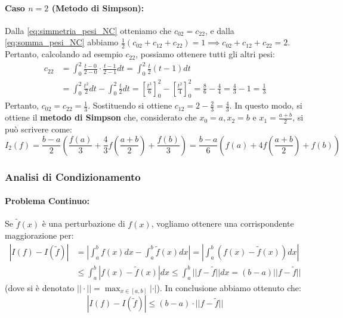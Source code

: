 \paragraph{Caso $n=2$ (Metodo di Simpson):}
Dalla \eqref{eq:simmetria_pesi_NC} otteniamo che $c_{02} = c_{22}$, e dalla \eqref{eq:somma_pesi_NC} abbiamo $\frac{1}{2}(c_{02} + c_{12} + c_{22}) = 1 \implies c_{02} + c_{12} + c_{22} = 2$.
Pertanto, calcolando ad esempio $c_{22}$, possiamo ottenere tutti gli altri pesi:
\begin{align*}
c_{22} &= \int_{0}^{2} \frac{t-0}{2-0} \cdot \frac{t-1}{2-1} dt = \int_{0}^{2} \frac{t}{2}(t-1) dt \\
&= \int_{0}^{2} \frac{t^2}{2} dt - \int_{0}^{2} \frac{t}{2} dt = \left[ \frac{t^3}{6} \right]_0^2 - \left[ \frac{t^2}{4} \right]_0^2 = \frac{8}{6} - \frac{4}{4} = \frac{4}{3} - 1 = \frac{1}{3}
\end{align*}
Pertanto, $c_{02} = c_{22} = \frac{1}{3}$. Sostituendo si ottiene $c_{12} = 2 - \frac{2}{3} = \frac{4}{3}$.
In questo modo, si ottiene il \textbf{metodo di Simpson} che, considerato che $x_0 = a, x_2 = b$ e $x_1 = \frac{a+b}{2}$, si può scrivere come:
\begin{equation}
I_2(f) = \frac{b-a}{2} \left( \frac{f(a)}{3} + \frac{4}{3} f\left(\frac{a+b}{2}\right) + \frac{f(b)}{3} \right) = \frac{b-a}{6} \left( f(a) + 4f\left(\frac{a+b}{2}\right) + f(b) \right)
\end{equation}


\vspace{0.6cm}
\subsubsection{Analisi di Condizionamento}

\paragraph{Problema Continuo:} Se $\tilde{f}(x)$ è una perturbazione di $f(x)$, vogliamo ottenere una corrispondente maggiorazione per:
\begin{align*}
|I(f) - I(\tilde{f})| &= \left| \int_{a}^{b} f(x)dx - \int_{a}^{b} \tilde{f}(x)dx \right| = \left| \int_{a}^{b} (f(x) - \tilde{f}(x))dx \right| \\
&\le \int_{a}^{b} |f(x) - \tilde{f}(x)|dx \le \int_{a}^{b} ||f - \tilde{f}|| dx = (b-a) ||f - \tilde{f}||
\end{align*}
(dove si è denotato $|| \cdot || = \max_{x \in [a,b]} |\cdot|$).
In conclusione abbiamo ottenuto che:
\begin{equation}
|I(f) - I(\tilde{f})| \le (b-a) \cdot ||f - \tilde{f}||
\end{equation}

